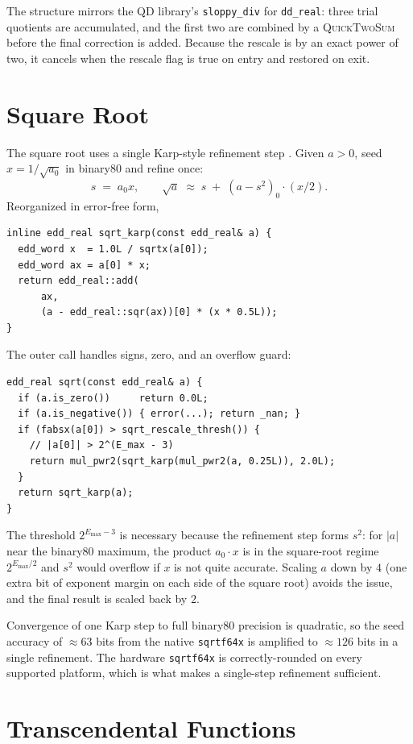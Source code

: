 \documentclass[11pt,a4paper]{article}
\begin{document}
The structure mirrors the QD library's \texttt{sloppy\_div} for
\texttt{dd\_real}: three trial quotients are accumulated, and the
first two are combined by a \textsc{QuickTwoSum} before the final
correction is added.  Because the rescale is by an exact power of
two, it cancels when the rescale flag is true on entry and
restored on exit.

\section{Square Root}
\label{sec:sqrt}

The square root uses a single Karp-style refinement step
\cite{Karp1997}.  Given $a > 0$, seed $x = 1/\sqrt{a_0}$ in
binary80 and refine once:
\[
  s \;=\; a_0 x, \qquad
  \sqrt{a} \;\approx\; s \;+\; (a - s^2)_0 \cdot (x/2).
\]
Reorganized in error-free form,
\begin{lstlisting}
inline edd_real sqrt_karp(const edd_real& a) {
  edd_word x  = 1.0L / sqrtx(a[0]);
  edd_word ax = a[0] * x;
  return edd_real::add(
      ax,
      (a - edd_real::sqr(ax))[0] * (x * 0.5L));
}
\end{lstlisting}
The outer call handles signs, zero, and an overflow guard:

\begin{lstlisting}
edd_real sqrt(const edd_real& a) {
  if (a.is_zero())     return 0.0L;
  if (a.is_negative()) { error(...); return _nan; }
  if (fabsx(a[0]) > sqrt_rescale_thresh()) {
    // |a[0]| > 2^(E_max - 3)
    return mul_pwr2(sqrt_karp(mul_pwr2(a, 0.25L)), 2.0L);
  }
  return sqrt_karp(a);
}
\end{lstlisting}
The threshold $2^{E_{\max} - 3}$ is necessary because the
refinement step forms $s^2$: for $|a|$ near the binary80 maximum,
the product $a_0 \cdot x$ is in the square-root regime
$2^{E_{\max}/2}$ and $s^2$ would overflow if $x$ is not quite
accurate.  Scaling $a$ down by $4$ (one extra bit of exponent
margin on each side of the square root) avoids the issue, and the
final result is scaled back by $2$.

Convergence of one Karp step to full binary80 precision is
quadratic, so the seed accuracy of $\approx 63$ bits from the
native \texttt{sqrtf64x} is amplified to $\approx 126$ bits in a
single refinement.  The hardware \texttt{sqrtf64x} is
correctly-rounded on every supported platform, which is what
makes a single-step refinement sufficient.

\section{Transcendental Functions}
\label{sec:trans}
\end{document}

